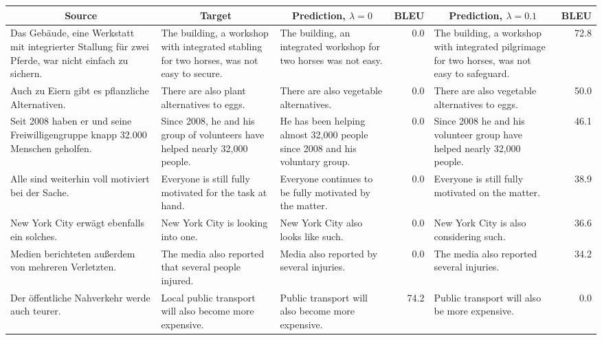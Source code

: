 \documentclass[10pt,a4paper]{article}
\begin{document}
\begin{table}
	\footnotesize
	\begin{tabularx}{\textwidth}{XXXrXr}
		\toprule
		\multicolumn{1}{c}{Source} &
		\multicolumn{1}{c}{Target} &
		\multicolumn{1}{c}{Prediction, $\lambda=0$} & \multicolumn{1}{c}{BLEU}&
		\multicolumn{1}{c}{Prediction, $\lambda=0.1$} & \multicolumn{1}{c}{BLEU}\\\midrule
		Das Gebäude, eine Werkstatt mit integrierter Stallung für zwei Pferde, war nicht einfach zu sichern. &
		The building, a workshop with integrated stabling for two horses, was not easy to secure. &	The building, an integrated workshop for two horses was not easy. & 0.0 &	
		The building, a workshop with integrated pilgrimage for two horses, was not easy to safeguard.	& 72.8\\
		
		Auch zu Eiern gibt es pflanzliche Alternativen.	&
		There are also plant alternatives to eggs.	&
		There are also vegetable alternatives. &	0.0 &
		There are also vegetable alternatives to eggs. &	50.0\\
		
		Seit 2008 haben er und seine Freiwilligengruppe knapp 32.000 Menschen geholfen. &
		Since 2008, he and his group of volunteers have helped nearly 32,000 people. &
		He has been helping almost 32,000 people since 2008 and his voluntary group. & 0.0 &
		Since 2008 he and his volunteer group have helped nearly 32,000 people. & 46.1\\
		
		Alle sind weiterhin voll motiviert bei der Sache. &
		Everyone is still fully motivated for the task at hand. &
		Everyone continues to be fully motivated by the matter. & 0.0 &
		Everyone is still fully motivated on the matter. & 38.9\\
		
		New York City erwägt ebenfalls ein solches. &
		New York City is looking into one. &
		New York City also looks like such. & 0.0 &
		New York City is also considering such.	&	36.6\\
		
		Medien berichteten außerdem von mehreren Verletzten. &
		The media also reported that several people injured. &
		Media also reported by several injuries. & 0.0 &
		The media also reported several injuries.	& 	34.2 \\
		\midrule	
		Der öffentliche Nahverkehr werde auch teurer. & 
		Local public transport will also become more expensive. &
		Public transport will also become more expensive. & 74.2 &
		Public transport will also be more expensive. & 0.0 \\
		

\end{tabularx}
\end{table}
\end{document}
